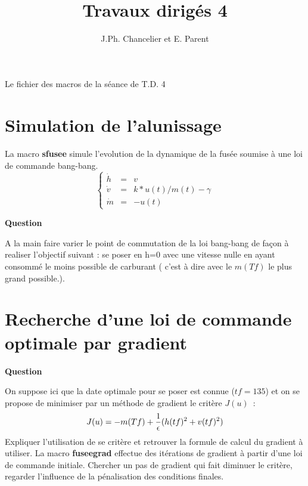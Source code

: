 
\textheight=660pt 
\textwidth=470pt 
\topmargin=-27pt 
\oddsidemargin=0pt 
\evensidemargin=0pt 
\title{Travaux dirig\'es 4}
\author{J.Ph. Chancelier et E. Parent}

\maketitle 
\def\cmarg{\hspace{1cm}}

\centerline{Le fichier des macros de la s\'eance de T.D. 4}


\Mhlp

\Mfinit

\section{Simulation de l'alunissage}

\paragraph{}La macro {\bf sfusee} simule l'evolution de la dynamique 
 de la fus\'ee soumise \`a une loi de commande bang-bang.
\[
    \left\{ \begin{array}{lcl}
	\dot{h} & = & v \\
	\dot{v} & = & k*u(t)/m(t) -\gamma\\
	\dot{m} & = & - u(t) \end{array}\right.
\]
\begin{center}
	{\bf Question}
\end{center}
A la main faire varier le point de commutation de la loi bang-bang de fa\c{c}on \`a realiser l'objectif suivant : se poser en h=0 avec une vitesse nulle en 
 ayant consomm\'e le moins possible de carburant ( c'est \`a dire avec le $m(Tf)$ le plus grand possible.).

\Msfusee

\section{Recherche d'une loi de commande optimale par gradient}

\begin{center}
	{\bf Question}
\end{center}

On suppose ici que la date optimale pour se poser est connue ($tf=135$)
et on se propose de minimiser par un m\'ethode de gradient le crit\`ere  
$J(u)$~:
\[
	J(u)= -m(Tf) + {1\over \epsilon} (h(tf)^2+v(tf)^2)
\]
Expliquer l'utilisation de se crit\`ere et retrouver la formule de calcul 
du gradient \`a utiliser. La macro {\bf fuseegrad} effectue des it\'erations 
 de gradient \`a partir d'une loi de commande initiale. 
 Chercher un pas de gradient qui fait diminuer le crit\`ere, regarder
 l'influence de la p\'enalisation des conditions finales.

\Mfuseegrad

\Mequad

\Mubang

\Mfcout

\Mfusee

\Mpousse

\Mtraj

\Mfuseep


